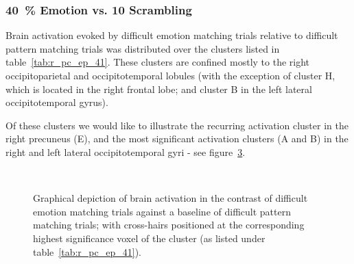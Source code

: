 	    \subsubsection{\SI{40}{\percent} Emotion vs. \SI{10}{\pixel} Scrambling}\label{sec:r_pc_ep_41}
		Brain activation evoked by difficult emotion matching trials relative to difficult pattern matching trials was distributed over the clusters listed in table~\ref{tab:r_pc_ep_41}.
		These clusters are confined mostly to the right occipitoparietal and occipitotemporal lobules (with the exception of cluster H, which is located in the right frontal lobe; and cluster B in the left lateral occipitotemporal gyrus).
		
		Of these clusters we would like to illustrate the recurring activation cluster in the right precuneus (E), and the most significant activation clusters (A and B) in the right and left lateral occipitotemporal gyri - see figure~\ref{fig:r_pc_ep_41}.
		\begin{figure}[H]
		    \begin{subfigure}[H]{0.495\textwidth}
			\centering{}
			\label{fig:r_pc_ep_41_pc}
		    \end{subfigure}
		    ~%
		    \begin{subfigure}[H]{0.495\textwidth}
			\centering{}
			\label{fig:r_pc_ep_41_ot}
		    \end{subfigure}
		    \caption{Graphical depiction of brain activation in the contrast of difficult emotion matching trials against a baseline of difficult pattern matching trials; with cross-hairs positioned at the corresponding highest significance voxel of the cluster (as listed under table~\ref{tab:r_pc_ep_41}).}
		    \label{fig:r_pc_ep_41}
		\end{figure}
		
